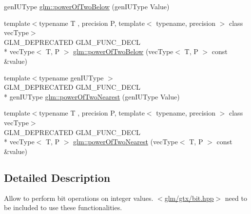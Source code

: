 \begin{DoxyCompactItemize}
gen\-I\-U\-Type \hyperlink{group__gtx__bit_ga3de7df63c589325101a2817a56f8e29d}{glm\-::power\-Of\-Two\-Below} (gen\-I\-U\-Type Value)
\item 
{\footnotesize template$<$typename T , precision P, template$<$ typename, precision $>$ class vec\-Type$>$ }\\G\-L\-M\-\_\-\-D\-E\-P\-R\-E\-C\-A\-T\-E\-D G\-L\-M\-\_\-\-F\-U\-N\-C\-\_\-\-D\-E\-C\-L \\*
vec\-Type$<$ T, P $>$ \hyperlink{group__gtx__bit_gae33bb1ca2b55846b23a0f0796a679195}{glm\-::power\-Of\-Two\-Below} (vec\-Type$<$ T, P $>$ const \&value)
\item 
{\footnotesize template$<$typename gen\-I\-U\-Type $>$ }\\G\-L\-M\-\_\-\-D\-E\-P\-R\-E\-C\-A\-T\-E\-D G\-L\-M\-\_\-\-F\-U\-N\-C\-\_\-\-D\-E\-C\-L \\*
gen\-I\-U\-Type \hyperlink{group__gtx__bit_ga5f65973a5d2ea38c719e6a663149ead9}{glm\-::power\-Of\-Two\-Nearest} (gen\-I\-U\-Type Value)
\item 
{\footnotesize template$<$typename T , precision P, template$<$ typename, precision $>$ class vec\-Type$>$ }\\G\-L\-M\-\_\-\-D\-E\-P\-R\-E\-C\-A\-T\-E\-D G\-L\-M\-\_\-\-F\-U\-N\-C\-\_\-\-D\-E\-C\-L \\*
vec\-Type$<$ T, P $>$ \hyperlink{group__gtx__bit_ga2d7e85995d097518b8d70cd409bda39e}{glm\-::power\-Of\-Two\-Nearest} (vec\-Type$<$ T, P $>$ const \&value)
\end{DoxyCompactItemize}


\subsection{Detailed Description}
Allow to perform bit operations on integer values. $<$\hyperlink{bit_8hpp}{glm/gtx/bit.\-hpp}$>$ need to be included to use these functionalities. 

